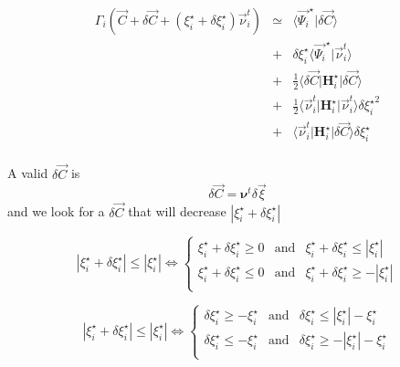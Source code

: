 \documentclass[aps,12pt]{revtex4}
\begin{document}
\begin{equation}
\begin{array}{rcl}
	\Gamma_i\left( \vec{C} + \delta\vec{C} + (\xi_i^\star+\delta\xi_i^\star) \vec{\nu}^t_i \right)
	&\simeq &\langle \vec{\Psi_i}^\star \vert \delta\vec{C} \rangle \\
	&+& \delta\xi_i^\star \langle \vec{\Psi_i}^\star \vert \vec{\nu}^t_i  \rangle\\
	& + & \frac{1}{2} \langle \delta\vec{C} \vert \bm{H}_i^\star \vert \delta\vec{C} \rangle \\
	& + & \frac{1}{2} \langle \vec{\nu}^t_i  \vert \bm{H}_i^\star \vert \vec{\nu}^t_i  \rangle {\delta\xi_i^\star}^2\\
	& + & \langle \vec{\nu}^t_i  \vert \bm{H}_i^\star \vert \delta\vec{C} \rangle \delta\xi_i^\star\\
\end{array}
\end{equation} 

A valid $\delta\vec{C}$ is
\begin{equation}
	\delta\vec{C} = \bm{\nu}^t \delta\vec{\xi}
\end{equation}
and we look for a $\delta \vec{C}$ that will decrease $|\xi_i^\star+\delta \xi_i^\star|$

\begin{equation}
|\xi_i^\star+\delta \xi_i^\star| \leq |\xi_i^\star| 
\Leftrightarrow 
\left\lbrace
\begin{array}{rcl}
\xi_i^\star+\delta \xi_i^\star \geq 0 & \text{and} & \xi_i^\star+\delta \xi_i^\star \leq |\xi_i^\star|\\
\xi_i^\star+\delta \xi_i^\star \leq 0 & \text{and} & \xi_i^\star+\delta \xi_i^\star \geq -|\xi_i^\star|\\
\end{array}
\right.
\end{equation}

\begin{equation}
|\xi_i^\star+\delta \xi_i^\star| \leq |\xi_i^\star| 
\Leftrightarrow 
\left\lbrace
\begin{array}{rcl}
 \delta\xi_i^\star  \geq - \xi_i^\star  & \text{and} & \delta \xi_i^\star \leq |\xi_i^\star| - \xi_i^\star\\
\delta  \xi_i^\star \leq - \xi_i^\star  & \text{and} & \delta \xi_i^\star \geq -|\xi_i^\star| - \xi_i^\star\\
\end{array}
\right.
\end{equation}
\end{document}
